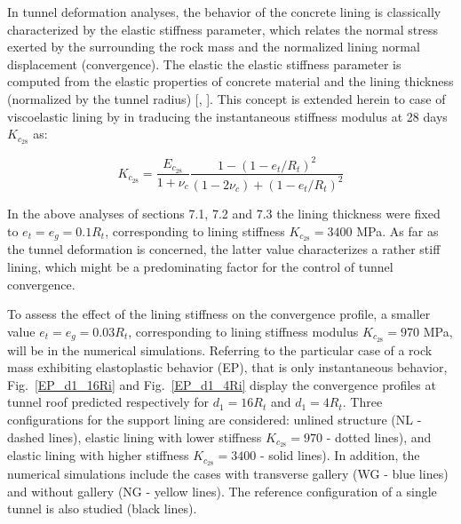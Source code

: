 \documentclass[a4paper,fleqn]{cas-sc}
\begin{document}
In tunnel deformation analyses, the behavior of the concrete lining is classically characterized by the elastic stiffness parameter, which relates the normal stress exerted by the surrounding the rock mass and the normalized lining normal displacement (convergence).   The elastic the elastic stiffness parameter is computed from the elastic properties of concrete material and the lining thickness (normalized by the tunnel radius) [, ]. This concept is extended herein to case of viscoelastic lining by in traducing the instantaneous stiffness modulus at 28 days $K_{c_{28}}$ as:

\begin{equation} \label{eq:8}
	K_{c_{28}} = \frac{E_{c_{28}}}{1+\nu_c}\frac{1-(1-e_t/R_t)^2}{(1-2\nu_c)+(1-e_t/R_t)^2}
\end{equation}

In the above analyses of sections 7.1, 7.2 and 7.3 the lining thickness were fixed to $e_t=e_g=0.1R_t$, corresponding to lining stiffness  $K_{c_{28}}=3400$ MPa. As far as the tunnel deformation is concerned, the latter value characterizes a rather stiff lining, which might be a predominating factor for the control of tunnel convergence.

To assess the effect of the lining stiffness on the convergence profile, a smaller value $e_t=e_g=0.03R_t$, corresponding to lining stiffness modulus $K_{c_{28}}=970$ MPa, will be in the numerical simulations. Referring to the particular case of a rock mass exhibiting elastoplastic behavior (EP), that is only instantaneous behavior, Fig.~\ref{EP_d1_16Ri} and Fig.~\ref{EP_d1_4Ri} display the convergence profiles at tunnel roof predicted respectively for $d_1=16R_t$ and $d_1=4R_t$.  Three configurations for the support lining are considered: unlined structure (NL - dashed lines), elastic lining with lower stiffness $K_{c_{28}}=970$ - dotted lines), and elastic lining with higher stiffness $K_{c_{28}}=3400$ - solid lines). In addition, the numerical simulations include the cases with transverse gallery (WG - blue lines) and without gallery (NG - yellow lines). The reference configuration of a single tunnel is also studied (black lines). 
\end{document}
